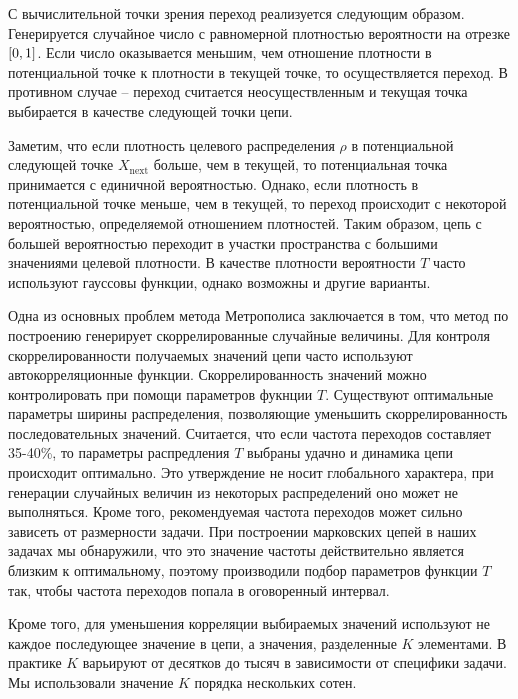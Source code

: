С вычислительной точки зрения переход реализуется следующим образом. Генерируется случайное число с равномерной плотностью вероятности на отрезке $\left[ 0, 1 \right]$. Если число оказывается меньшим, чем отношение плотности в потенциальной точке к плотности в текущей точке, то осуществляется переход. В противном случае -- переход считается неосуществленным и текущая точка выбирается в качестве следующей точки цепи. \par
Заметим, что если плотность целевого распределения $\rho$ в потенциальной следующей точке $X_\text{next}$ больше, чем в текущей, то потенциальная точка принимается с единичной вероятностью. Однако, если плотность в потенциальной точке меньше, чем в текущей, то переход происходит с некоторой вероятностью, определяемой отношением плотностей. Таким образом, цепь с большей вероятностью переходит в участки пространства с большими значениями целевой плотности. В качестве плотности вероятности $T$ часто используют гауссовы функции, однако возможны и другие варианты. \par
Одна из основных проблем метода Метрополиса заключается в том, что метод по построению генерирует скоррелированные случайные величины. Для контроля скоррелированности получаемых значений цепи часто используют автокорреляционные функции. Скоррелированность значений можно контролировать при помощи параметров фукнции $T$. Существуют оптимальные параметры ширины распределения, позволяющие уменьшить скоррелированность последовательных значений. Считается, что если частота переходов составляет 35-40\%, то параметры распредления $T$ выбраны удачно и динамика цепи происходит оптимально. Это утверждение не носит глобального характера, при генерации случайных величин из некоторых распределений оно может не выполняться. Кроме того, рекомендуемая частота переходов может сильно зависеть от размерности задачи. При построении марковских цепей в наших задачах мы обнаружили, что это значение частоты действительно является близким к оптимальному, поэтому производили подбор параметров функции $T$ так, чтобы частота переходов попала в оговоренный интервал. \par
Кроме того, для уменьшения корреляции выбираемых значений используют не каждое последующее значение в цепи, а значения, разделенные $K$ элементами. В практике $K$ варьируют от десятков до тысяч в зависимости от специфики задачи. Мы использовали значение $K$ порядка нескольких сотен. \par
